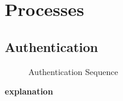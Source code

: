 \section{Processes}
\subsection{Authentication}

\begin{figure}[hb]
    \centering
    \caption{Authentication Sequence}
    \label{fig:seq-desktop-auth}
\end{figure}

\textbf{explanation}
\newpage

